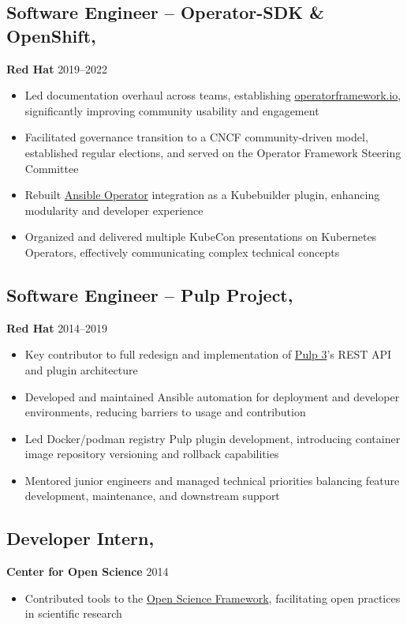 \documentclass[11pt,letterpaper]{article}
\begin{document}
\subsection{Software Engineer -- Operator-SDK \& OpenShift,} \textbf{Red Hat}
\hfill\textnormal{\small2019--2022}
\begin{itemize}
  \item Led documentation overhaul across teams, establishing \href{https://operatorframework.io}{operatorframework.io}, significantly improving community usability and engagement
  \item Facilitated governance transition to a CNCF community-driven model, established regular elections, and served on the Operator Framework Steering Committee
  \item Rebuilt \href{https://github.com/operator-framework/operator-sdk}{Ansible Operator} integration as a Kubebuilder plugin, enhancing modularity and developer experience
  \item Organized and delivered multiple KubeCon presentations on Kubernetes Operators, effectively communicating complex technical concepts
\end{itemize}

\subsection{Software Engineer -- Pulp Project,} \textbf{Red Hat}
\hfill\textnormal{\small2014--2019}
\begin{itemize}
  \item Key contributor to full redesign and implementation of \href{https://github.com/pulp/pulpcore}{Pulp 3}'s REST API and plugin architecture
  \item Developed and maintained Ansible automation for deployment and developer environments, reducing barriers to usage and contribution
  \item Led Docker/podman registry Pulp plugin development, introducing container image repository versioning and rollback capabilities
  \item Mentored junior engineers and managed technical priorities balancing feature development, maintenance, and downstream support
\end{itemize}

\subsection{Developer Intern,} \textbf{Center for Open Science}
\hfill\textnormal{\small2014}
\begin{itemize}
  \item Contributed tools to the \href{https://github.com/CenterForOpenScience/osf.io}{Open Science Framework}, facilitating open practices in scientific research
\end{itemize}
\end{document}

